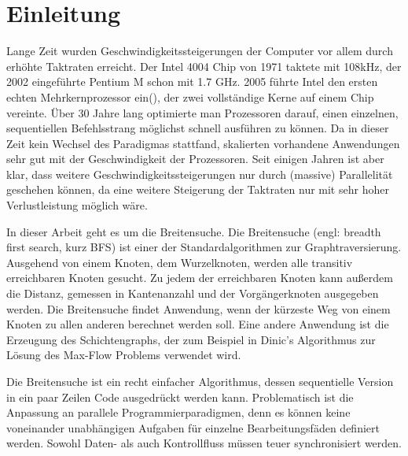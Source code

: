 \chapter{Einleitung}
\label{ch:einleitung}

Lange Zeit wurden Geschwindigkeitssteigerungen der Computer vor allem durch erhöhte Taktraten erreicht. Der Intel 4004 Chip von 1971 taktete mit 108kHz, der 2002 eingeführte Pentium M schon mit 1.7 GHz. 2005 führte Intel den ersten echten Mehrkernprozessor ein(\cite{Intel:2006:Online}), der zwei vollständige Kerne auf einem Chip vereinte. Über 30 Jahre lang optimierte man Prozessoren darauf, einen einzelnen, sequentiellen Befehlsstrang möglichst schnell ausführen zu können. Da in dieser Zeit kein Wechsel des Paradigmas stattfand, skalierten vorhandene Anwendungen sehr gut mit der Geschwindigkeit der Prozessoren. Seit einigen Jahren ist aber klar, dass weitere Geschwindigkeitssteigerungen nur durch (massive) Parallelität geschehen können, da eine weitere Steigerung der Taktraten nur mit sehr hoher Verlustleistung möglich wäre.  

In dieser Arbeit geht es um die Breitensuche. Die Breitensuche (engl: breadth first search, kurz BFS) ist einer der Standardalgorithmen zur Graphtraversierung. Ausgehend von einem Knoten, dem Wurzelknoten, werden alle transitiv erreichbaren Knoten gesucht. Zu jedem der erreichbaren Knoten kann außerdem die Distanz, gemessen in Kantenanzahl und der Vorgängerknoten ausgegeben werden. Die Breitensuche findet Anwendung, wenn der kürzeste Weg von einem Knoten zu allen anderen berechnet werden soll. Eine andere Anwendung ist die Erzeugung des Schichtengraphs, der zum Beispiel in Dinic's Algorithmus zur Lösung des Max-Flow Problems \cite{Dinitz:2006} verwendet wird. 

Die Breitensuche ist ein recht einfacher Algorithmus, dessen sequentielle Version in ein paar Zeilen Code ausgedrückt werden kann. Problematisch ist die Anpassung an parallele Programmierparadigmen, denn es können keine voneinander unabhängigen Aufgaben für einzelne Bearbeitungsfäden definiert werden. Sowohl Daten- als auch Kontrollfluss müssen teuer synchronisiert werden.


